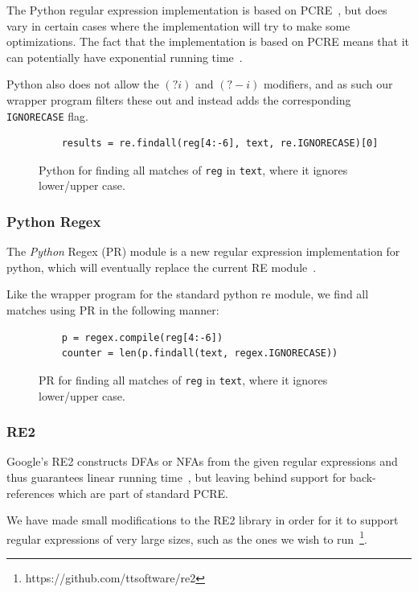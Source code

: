 \documentclass[12pt]{article}
\theoremstyle{definition}
\begin{document}
The Python regular expression implementation is based on PCRE~\cite{pcre}, but does vary in certain cases where the implementation will try to make some optimizations. The fact that the implementation is based on PCRE means that it can potentially have exponential running time~\cite{pcre-running-time}.

Python also does not allow the $(?i)$ and $(?-i)$ modifiers, and as such our wrapper program filters these out and instead adds the corresponding \texttt{IGNORECASE} flag.

\begin{figure}[H]
	\begin{lstlisting}
	results = re.findall(reg[4:-6], text, re.IGNORECASE)[0]
	\end{lstlisting}
	\caption{Python for finding all matches of \texttt{reg} in \texttt{text}, where it ignores lower/upper case.}
\end{figure}


\subsubsection{Python Regex}

The \mbox{\emph{Python}} Regex (PR) module is a new regular expression implementation for python, which will eventually replace the current RE module~\cite{python-regex}.

Like the wrapper program for the standard python re module, we find all matches using PR in the following manner:
\begin{figure}[H]
	\begin{lstlisting}
	p = regex.compile(reg[4:-6])
	counter = len(p.findall(text, regex.IGNORECASE))
	\end{lstlisting}
	\caption{PR for finding all matches of \texttt{reg} in \texttt{text}, where it ignores lower/upper case.}
\end{figure}


\subsubsection{RE2}

Google's RE2 constructs DFAs or NFAs from the given regular expressions and thus guarantees linear running time~\cite{pcre-running-time}, but leaving behind support for back-references which are part of standard PCRE.

We have made small modifications to the RE2 library in order for it to support regular expressions of very large sizes, such as the ones we wish to run~\footnote{https://github.com/ttsoftware/re2}.
\end{document}
